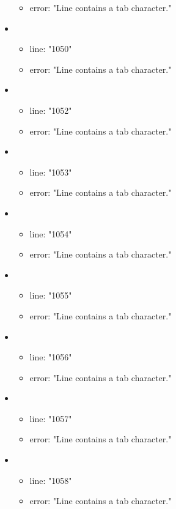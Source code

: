 \begin{itemize}
\begin{itemize}
		\item error: "Line contains a tab character." 
	\end{itemize}
	\item 
	\begin{itemize} 
		\item line: "1050" 
		\item error: "Line contains a tab character." 
	\end{itemize}
	\item 
	\begin{itemize} 
		\item line: "1052" 
		\item error: "Line contains a tab character." 
	\end{itemize}
	\item 
	\begin{itemize} 
		\item line: "1053" 
		\item error: "Line contains a tab character." 
	\end{itemize}
	\item 
	\begin{itemize} 
		\item line: "1054" 
		\item error: "Line contains a tab character." 
	\end{itemize}
	\item 
	\begin{itemize} 
		\item line: "1055" 
		\item error: "Line contains a tab character." 
	\end{itemize}
	\item 
	\begin{itemize} 
		\item line: "1056" 
		\item error: "Line contains a tab character." 
	\end{itemize}
	\item 
	\begin{itemize} 
		\item line: "1057" 
		\item error: "Line contains a tab character." 
	\end{itemize}
	\item 
	\begin{itemize} 
		\item line: "1058" 
		\item error: "Line contains a tab character." 
	\end{itemize}

\end{itemize}
